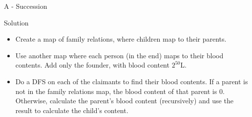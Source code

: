 \renewcommand{\insertshortauthor}{Problem Author: Jimmy M{\aa}rdell}
\begin{frame}{A - Succession}

\begin{block}{Solution}
  \begin{itemize}
    \item Create a map of family relations, where children map to their parents.
	\item Use another map where each person (in the end) maps to their blood contents. Add only the founder, with blood content $2^{50}$L.
	\item Do a DFS on each of the claimants to find their blood contents. If a parent is not in the family relations map, the blood content of that parent is 0. Otherwise, calculate the parent's blood content (recursively) and use the result to calculate the child's content. 
  \end{itemize}
\end{block}

\end{frame}
